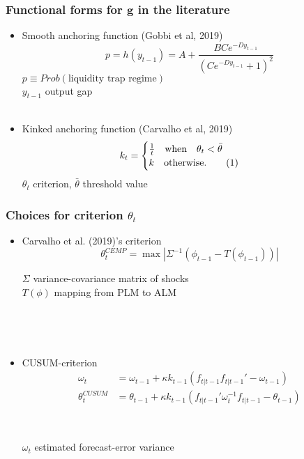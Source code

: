 \documentclass[10pt]{beamer}
\newcommand\numberthis{\addtocounter{equation}{1}\tag{\theequation}} %
\begin{document}
\begin{frame}[plain]  %
	\frametitle{Functional forms for $\mathbf{g}$ in the literature}
	\label{g}
\begin{itemize}
\item Smooth anchoring function (Gobbi et al, 2019)
\begin{equation}
 p = h(y_{t-1}) = A + \frac{B C e^{-D y_{t-1}}}{( C e^{-D y_{t-1}}+1)^2}
\end{equation}
$p \equiv Prob(\text{liquidity trap regime}) $ \\
$y_{t-1}$ output gap \\


\

\item Kinked anchoring function (Carvalho et al, 2019)
 \begin{align*}
k_t & = \begin{cases} \frac{1}{t} \quad \text{when} \quad \theta_t < \bar{\theta}  \\ k \quad \text{otherwise.}\numberthis
\end{cases} 
\end{align*}
$\theta_t$ criterion, $\bar{\theta}$ threshold value

\end{itemize}

\vfill 
\hyperlink{anchoring1}{}	

\end{frame}


\begin{frame}[plain]  %
	\frametitle{Choices for criterion $\theta_t$}
	\label{g}
\begin{itemize}
\item Carvalho et al. (2019)'s criterion  
\begin{equation}
\theta_t^{CEMP} = \max | \Sigma^{-1} ( \phi_{t-1} - T(\phi_{t-1})) |
\end{equation}


$\Sigma$ variance-covariance matrix of shocks \\
$T(\phi)$ mapping from PLM to ALM

\

\

\item CUSUM-criterion
\begin{align}
\omega_t & =  \omega_{t-1} + \kappa k_{t-1}(f_{t|t-1} f_{t|t-1}'  -\omega_{t-1})\\
\theta_t^{CUSUM} & =  \theta_{t-1} + \kappa k_{t-1}(f_{t|t-1}'\omega_t^{-1}f_{t|t-1} -\theta_{t-1})
\end{align}

\

$\omega_t$ estimated forecast-error variance
\end{itemize}




\vfill

\hyperlink{anchoring1}{}	


\end{frame}
\end{document}
